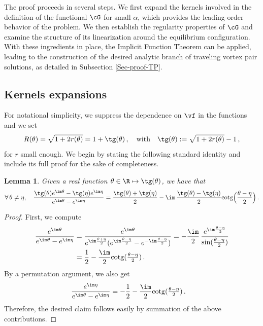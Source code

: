 \documentclass[a4paper,reqno,10pt]{article}
\newtheorem{lem}{Lemma}[section]
\begin{document}
The proof proceeds in several steps. We first expand the kernels involved in the definition of the functional $\cG$ for small $\alpha$, which provides the leading-order behavior of the problem. We then establish the regularity properties of $\cG$ and examine the structure of its linearization around the equilibrium configuration. With these ingredients in place, the Implicit Function Theorem can be applied, leading to the construction of the desired analytic branch of traveling vortex pair solutions, as detailed in Subsection \ref{Sec-proof-TP}.




\subsection{ Kernels  expansions}
For notational simplicity, we suppress the dependence on $\vf$ in the functions and we set
\begin{equation}
	R(\theta) = \sqrt{1+2 r(\theta)} = 1 + \tg(\theta) \,, \quad \textnormal{with} \quad \tg(\theta):= \sqrt{1+2 r(\theta)} - 1\,,
\end{equation}
for $r$ small enough. We begin by stating the following standard identity and include its full proof for the sake of completeness.
\begin{lem}\label{lemma-1-Id}
	Given a real function $\theta\in\R\mapsto \tg(\theta)$, we have that
	\begin{equation}
		\forall\, \theta\neq\eta,\quad \frac{\tg(\theta)e^{\im\theta}-\tg(\eta)e^{\im\eta}}{e^{\im\theta}-e^{\im\eta}} = \frac{\tg(\theta)+\tg(\eta)}{2} - \im\, \frac{\tg(\theta)-\tg(\eta)}{2} {\rm cotg}\Big(\frac{\theta-\eta}{2}\Big) \,. 
	\end{equation}
\end{lem}
\begin{proof}
	First, we compute
    \begin{align*}
		\frac{e^{\im\theta}}{e^{\im\theta}-e^{\im\eta}}& = \frac{e^{\im\theta}}{e^{\im\frac{\theta+\eta}{2}}(e^{\im\frac{\theta-\eta}{2}}-e^{-\im\frac{\theta-\eta}{2}})}=-\frac{\im}{2}\,\frac{e^{\im\frac{\theta-\eta}{2}}}{\sin(\tfrac{\theta-\eta}{2})}\\
        &=\frac12-\frac{\im}{2}{\rm cotg}(\tfrac{\theta-\eta}{2}) \,.
	\end{align*}
	By a permutation argument, we also get
    \begin{align*}
		\frac{e^{\im\eta}}{e^{\im\theta}-e^{\im\eta}}
        &=-\frac12-\frac{\im}{2}{\rm cotg}(\tfrac{\theta-\eta}{2}) \,.
	\end{align*}
    Therefore, the desired claim follows easily by summation of the above contributions.
\end{proof}
\end{document}
